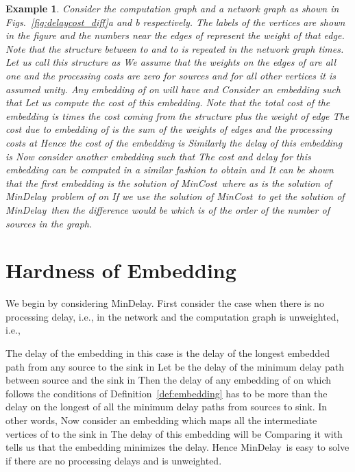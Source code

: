 \documentclass[journal]{IEEEtran}
\newtheorem{example}{{\bf Example}}
\newcommand{\mincost}{\textsf{MinCost}}
\newcommand{\mindelay}{\textsf{MinDelay}}
\begin{document}
\begin{example}
  \label{ex:compare}
  Consider the computation graph  and a network graph
   as shown in
  Figs.~\ref{fig:delaycost_diff}a and b respectively. The labels of
  the vertices are shown in the figure and the numbers near the edges
  of  represent the weight of that edge. Note that the structure
  between  to  and  to  is repeated in the network
  graph  times. Let us call this structure as  We assume that
  the weights on the edges of  are all one and the
  processing costs are zero for sources and for all other vertices it
  is assumed unity. Any embedding  of  on
   will have  and  Consider an embedding
   such that  Let us compute the
  cost of this embedding. Note that the total cost of the embedding is
   times the cost coming from the structure  plus the weight of
  edge  The cost due to embedding of  is the sum of the
  weights of edges  and the processing
  costs at  Hence the cost of the embedding is
   Similarly the
  delay of this embedding is  Now consider another embedding  such that
   The cost and delay for this embedding can be computed in a
  similar fashion to obtain  and 
  It can be shown that the first embedding  is the
  solution of \mincost\ where as  is the solution of
  \mindelay\ problem of  on  If we use the solution
  of \mincost\ to get the solution of \mindelay\ then the difference
  would be  which is of the
  order of the number of sources in the graph.
\end{example}



\section{Hardness of Embedding}
\label{sec:hardness}


We begin by considering \mindelay. First consider the case when there
is no processing delay, i.e.,
 in the network and the
computation graph is unweighted, i.e., 
 
The delay of the embedding in this case is the delay of the longest
embedded path from any source to the sink in  Let
 be the delay of the minimum delay path between
source  and the sink  in  Then the delay of any
embedding of  on  which follows the conditions of
Definition~\ref{def:embedding} has to be more than the delay on the
longest of all the minimum delay paths from sources to sink. In other
words, 
Now consider an embedding  which maps all the
intermediate vertices of  to the sink in  The delay
of this embedding will be 
Comparing it with  tells us that the embedding
 minimizes the delay. Hence \mindelay\ is easy to
solve if there are no processing delays and  is
unweighted.
\end{document}

